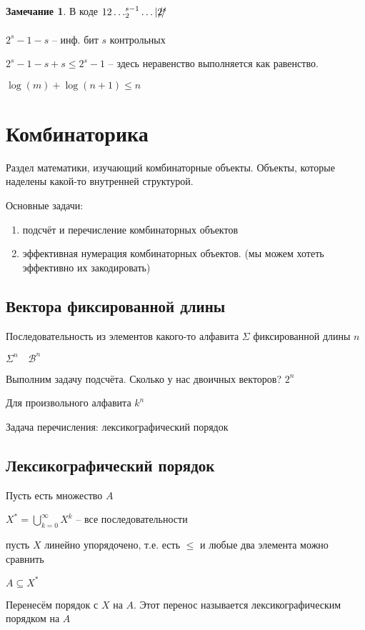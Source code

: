 \documentclass{book}
\theoremstyle{definition}
\newtheorem*{note}{Замечание}
\begin{document}
\begin{note}
    В коде $12\ldots_2^{s-1}\ldots|\xout{2^s}$

    $2^s-1-s$ -- инф. бит  $s$ контрольных

     $2^s-1-s+s\leqslant 2^s-1$ -- здесь неравенство выполняется как равенство.

     $\log (m) + \log (n+1)\leqslant n$
\end{note}

\chapter{Комбинаторика}

Раздел математики, изучающий комбинаторные объекты. Объекты, которые наделены какой-то внутренней структурой.

Основные задачи:
\begin{enumerate}
    \item подсчёт и перечисление комбинаторных объектов
    \item эффективная нумерация комбинаторных объектов. (мы можем хотеть эффективно их закодировать)
\end{enumerate}

\section{Вектора фиксированной длины}

Последовательность из элементов какого-то алфавита $\Sigma$ фиксированной длины $n$

$\Sigma^n\quad \mathscr{B}^n$

Выполним задачу подсчёта. Сколько у нас двоичных векторов?  $2^n$

Для произвольного алфавита  $k^n$

Задача перечисления: лексикографический порядок

\section{Лексикографический порядок}

Пусть есть множество  $A$ 

$X^* = \bigcup\limits_{k=0}^{\infty } X^k$ -- все последовательности 

пусть $X$ линейно упорядочено, т.е. есть  $\leqslant $ и любые два элемента можно сравнить

$A\subseteq X^*$

Перенесём порядок с $X$ на  $A$. Этот перенос называется лексикографическим порядком на $A$
\end{document}
